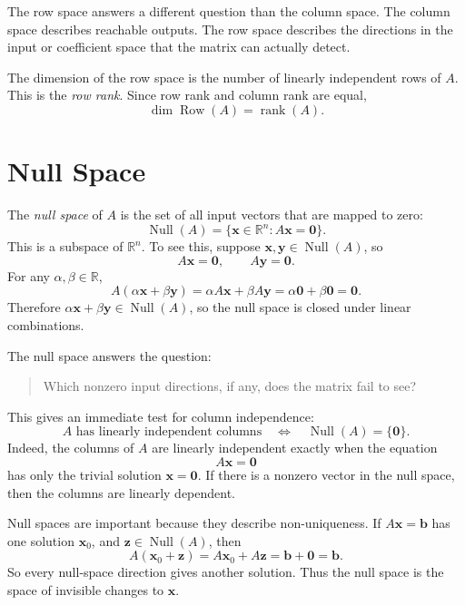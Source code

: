 The row space answers a different question than the column space. The column space describes reachable outputs. The row space describes the directions in the input or coefficient space that the matrix can actually detect.

The dimension of the row space is the number of linearly independent rows of \(A\). This is the \emph{row rank}. Since row rank and column rank are equal,
\[
    \dim\operatorname{Row}(A)=\operatorname{rank}(A).
\]

\section{Null Space}
\label{mf:null-space}

The \emph{null space} of \(A\) is the set of all input vectors that are mapped to zero:
\[
    \operatorname{Null}(A)
    =\{\mathbf{x}\in\mathbb{R}^n:A\mathbf{x}=\mathbf{0}\}.
\]
This is a subspace of \(\mathbb{R}^n\). To see this, suppose \(\mathbf{x},\mathbf{y}\in\operatorname{Null}(A)\), so
\[
    A\mathbf{x}=\mathbf{0},
    \qquad
    A\mathbf{y}=\mathbf{0}.
\]
For any \(\alpha,\beta\in\mathbb{R}\),
\[
    A(\alpha\mathbf{x}+\beta\mathbf{y})
    =\alpha A\mathbf{x}+\beta A\mathbf{y}
    =\alpha\mathbf{0}+\beta\mathbf{0}
    =\mathbf{0}.
\]
Therefore \(\alpha\mathbf{x}+\beta\mathbf{y}\in\operatorname{Null}(A)\), so the null space is closed under linear combinations.
\label{mf:null-space-subspace}

The null space answers the question:

\begin{quote}
Which nonzero input directions, if any, does the matrix fail to see?
\end{quote}

This gives an immediate test for column independence:
\[
    A \text{ has linearly independent columns}
    \quad\Longleftrightarrow\quad
    \operatorname{Null}(A)=\{\mathbf{0}\}.
\]
Indeed, the columns of \(A\) are linearly independent exactly when the equation
\[
    A\mathbf{x}=\mathbf{0}
\]
has only the trivial solution \(\mathbf{x}=\mathbf{0}\). If there is a nonzero vector in the null space, then the columns are linearly dependent.
\label{mf:null-space-linear-independence}

Null spaces are important because they describe non-uniqueness. If \(A\mathbf{x}=\mathbf{b}\) has one solution \(\mathbf{x}_0\), and \(\mathbf{z}\in\operatorname{Null}(A)\), then
\[
    A(\mathbf{x}_0+\mathbf{z})
    =A\mathbf{x}_0+A\mathbf{z}
    =\mathbf{b}+\mathbf{0}
    =\mathbf{b}.
\]
So every null-space direction gives another solution. Thus the null space is the space of invisible changes to \(\mathbf{x}\).

